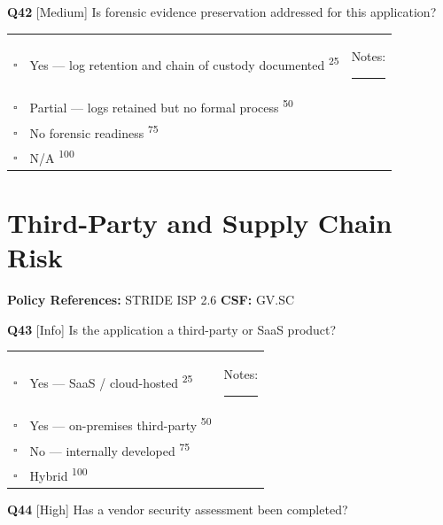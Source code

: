 \documentclass[11pt,landscape]{article}
\begin{document}
\vspace{0.3cm}

\noindent\colorbox{medbg}{\textbf{Q42} [Medium]} Is forensic evidence preservation addressed for this application?

\begin{tabularx}{\textwidth}{cXX}
$\square$ & Yes --- log retention and chain of custody documented \textsuperscript{\scriptsize\textcolor{stridegray}{25}} & Notes: \rule{4cm}{0.4pt} \\
$\square$ & Partial --- logs retained but no formal process \textsuperscript{\scriptsize\textcolor{stridegray}{50}} &  \\
$\square$ & No forensic readiness \textsuperscript{\scriptsize\textcolor{stridegray}{75}} &  \\
$\square$ & N/A \textsuperscript{\scriptsize\textcolor{stridegray}{100}} &  \\
\end{tabularx}

\vspace{0.3cm}

\newpage

\section{Third-Party and Supply Chain Risk}

\textbf{Policy References:} STRIDE ISP 2.6 \hfill \textbf{CSF:} GV.SC

\noindent\colorbox{white}{\textbf{Q43} [Info]} Is the application a third-party or SaaS product?

\begin{tabularx}{\textwidth}{cXX}
$\square$ & Yes --- SaaS / cloud-hosted \textsuperscript{\scriptsize\textcolor{stridegray}{25}} & Notes: \rule{4cm}{0.4pt} \\
$\square$ & Yes --- on-premises third-party \textsuperscript{\scriptsize\textcolor{stridegray}{50}} &  \\
$\square$ & No --- internally developed \textsuperscript{\scriptsize\textcolor{stridegray}{75}} &  \\
$\square$ & Hybrid \textsuperscript{\scriptsize\textcolor{stridegray}{100}} &  \\
\end{tabularx}

\vspace{0.3cm}

\noindent\colorbox{highbg}{\textbf{Q44} [High]} Has a vendor security assessment been completed?
\end{document}
